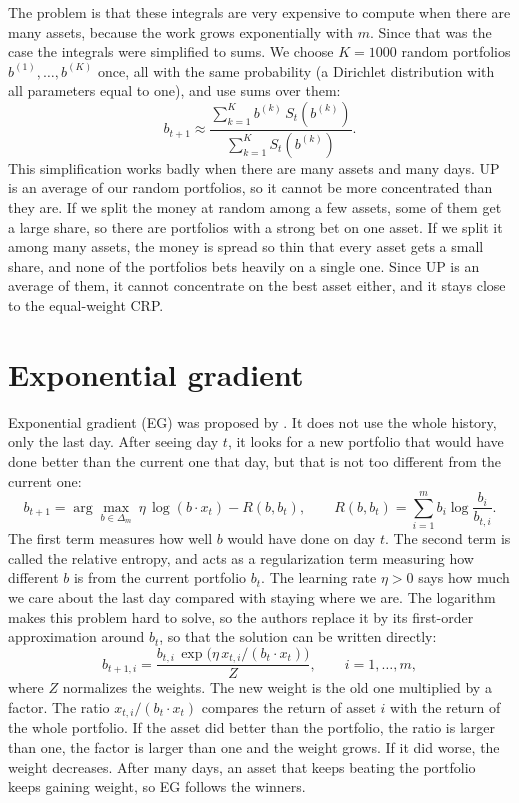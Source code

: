 The problem is that these integrals are very expensive to compute when there are many
assets, because the work grows exponentially with $m$. Since that was the case the
integrals were simplified to sums. We choose $K=1000$ random portfolios $b^{(1)},\dots,b^{(K)}$ 
once, all with the same probability (a Dirichlet distribution with all parameters equal to
one), and use sums over them:
\[
b_{t+1}\approx\frac{\sum_{k=1}^{K}b^{(k)}\,S_t(b^{(k)})}{\sum_{k=1}^{K}S_t(b^{(k)})} .
\]
This simplification works badly when there are many assets and many days. UP is an average of our random 
portfolios, so it cannot be more concentrated than they are. If we split the money at random among a few 
assets, some of them get a large share, so there are portfolios with a strong bet on one asset. If we 
split it among many assets, the money is spread so thin that every asset gets a small share, and none 
of the portfolios bets heavily on a single one. Since UP is an average of them, it cannot concentrate on the
best asset either, and it stays close to the equal-weight CRP. %


\section{Exponential gradient}

Exponential gradient (EG) was proposed by \textcite{helmbold98}. It does not use the
whole history, only the last day. After seeing day $t$, it looks for a new portfolio that would have done 
better than the current one that day, but that is not too different from the current one:
\begin{equation}
b_{t+1}=\arg\max_{b\in\Delta_m}\ \eta\,\log(b\cdot x_t)-R(b,b_t),
\qquad R(b,b_t)=\sum_{i=1}^m b_i\log\frac{b_i}{b_{t,i}} .
\label{eq:eg}
\end{equation}
The first term measures how well $b$ would have done on day $t$. The second term is called the
relative entropy, and acts as a regularization term measuring how different $b$ is from the current
portfolio $b_t$. The learning rate $\eta>0$ says how much we care about the last day compared
with staying where we are. The logarithm makes this problem hard to solve, so the
authors replace it by its first-order approximation around $b_t$, so that the solution can be written directly:
\begin{equation}
b_{t+1,i}=\frac{b_{t,i}\,\exp\!\big(\eta\,x_{t,i}/(b_t\cdot x_t)\big)}{Z},
\qquad i=1,\dots,m,
\label{eq:eg-update}
\end{equation}
where $Z$ normalizes the weights. The new weight is the old 
one multiplied by a factor. The ratio $x_{t,i}/(b_t\cdot x_t)$ compares the return of
asset $i$ with the return of the whole portfolio. If the asset did better than the
portfolio, the ratio is larger than one, the factor is larger than one and the weight
grows. If it did worse, the weight decreases. After many days, an asset that keeps
beating the portfolio keeps gaining weight, so EG follows the winners.

